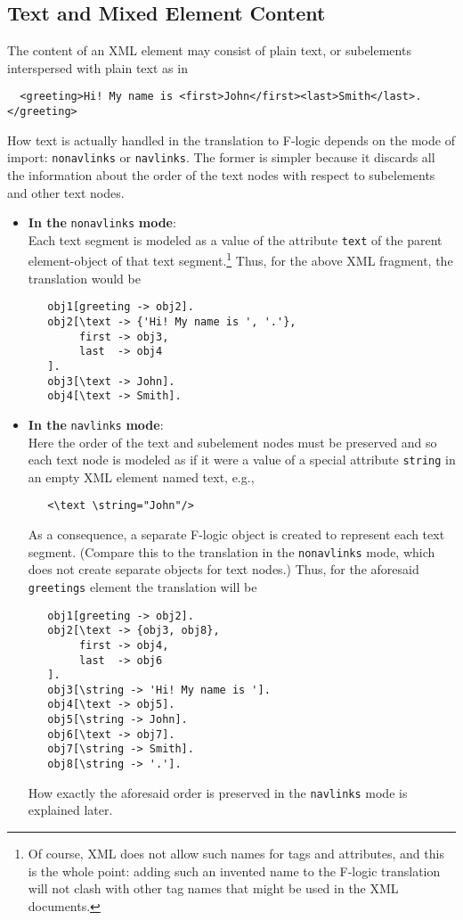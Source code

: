 \subsection{Text and Mixed Element Content}

The content of an XML element may consist of plain text, or
subelements interspersed with plain text as in
\begin{verbatim}
  <greeting>Hi! My name is <first>John</first><last>Smith</last>.</greeting> 
\end{verbatim}
How text is actually handled in the translation to F-logic depends on the
mode of import: \texttt{nonavlinks} or \texttt{navlinks}. The former is
simpler because it discards all the information about the order of the text
nodes with respect to subelements and other text nodes.
\begin{itemize}
\item  \textbf{In the} \texttt{nonavlinks} \textbf{mode}:\\
  Each text segment is modeled as a value of the attribute
  \texttt{\bs{}text} of the parent element-object of that text
  segment.\footnote{
    Of course, XML does not allow such names for tags and attributes, and this
    is the whole point: adding such an invented name to the F-logic
    translation  will not clash with other
    tag names that might be used in the XML documents.
    }
  Thus, for the above XML fragment, the translation would be
\begin{verbatim}
   obj1[greeting -> obj2].
   obj2[\text -> {'Hi! My name is ', '.'},
        first -> obj3,
        last  -> obj4
   ].
   obj3[\text -> John].
   obj4[\text -> Smith].
\end{verbatim}
\item \textbf{In the} \texttt{navlinks} \textbf{mode}:\\
  Here the order of the text and subelement nodes must be preserved and so
  each text node is modeled as if it were a value of a special attribute
  \texttt{\bs{}string} in an empty XML element named \bs{}text, e.g., 
\begin{verbatim}
   <\text \string="John"/>  
\end{verbatim}
  As a consequence, a separate F-logic object is created to represent each
  text segment. (Compare this to the translation in the \texttt{nonavlinks}
  mode, which does not create separate objects for text nodes.) 
  Thus, for the aforesaid \texttt{greetings} element the translation will be 
\begin{verbatim}
   obj1[greeting -> obj2].
   obj2[\text -> {obj3, obj8},
        first -> obj4,
        last  -> obj6
   ].
   obj3[\string -> 'Hi! My name is '].
   obj4[\text -> obj5].
   obj5[\string -> John].
   obj6[\text -> obj7].
   obj7[\string -> Smith].
   obj8[\string -> '.'].
\end{verbatim}
  How exactly the aforesaid order is preserved in the \texttt{navlinks} 
  mode is explained later.
\end{itemize}


